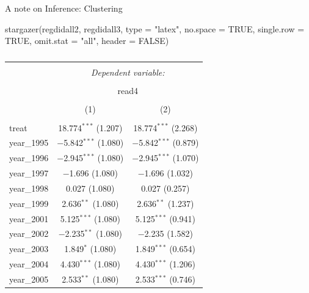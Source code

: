 \documentclass[
  ignorenonframetext,
]{beamer}
\newenvironment{Shaded}{\begin{snugshade}}{\end{snugshade}}
\newcommand{\AttributeTok}[1]{\textcolor[rgb]{0.77,0.63,0.00}{#1}}
\newcommand{\ConstantTok}[1]{\textcolor[rgb]{0.00,0.00,0.00}{#1}}
\newcommand{\FunctionTok}[1]{\textcolor[rgb]{0.00,0.00,0.00}{#1}}
\newcommand{\NormalTok}[1]{#1}
\newcommand{\StringTok}[1]{\textcolor[rgb]{0.31,0.60,0.02}{#1}}
\begin{document}
\begin{frame}[fragile]{A note on Inference: Clustering}
\protect\hypertarget{a-note-on-inference-clustering-2}{}
\tiny

\begin{Shaded}
\begin{Highlighting}[]
\FunctionTok{stargazer}\NormalTok{(regdidall2, regdidall3, }\AttributeTok{type =} \StringTok{"latex"}\NormalTok{, }\AttributeTok{no.space =} \ConstantTok{TRUE}\NormalTok{,}
    \AttributeTok{single.row =} \ConstantTok{TRUE}\NormalTok{, }\AttributeTok{omit.stat =} \StringTok{"all"}\NormalTok{, }\AttributeTok{header =} \ConstantTok{FALSE}\NormalTok{)}
\end{Highlighting}
\end{Shaded}

\begin{table}[!htbp] \centering 
  \caption{} 
  \label{} 
\begin{tabular}{@{\extracolsep{5pt}}lcc} 
\\[-1.8ex]\hline 
\hline \\[-1.8ex] 
 & \multicolumn{2}{c}{\textit{Dependent variable:}} \\ 
\cline{2-3} 
\\[-1.8ex] & \multicolumn{2}{c}{read4} \\ 
\\[-1.8ex] & (1) & (2)\\ 
\hline \\[-1.8ex] 
 treat & 18.774$^{***}$ (1.207) & 18.774$^{***}$ (2.268) \\ 
  year\_1995 & $-$5.842$^{***}$ (1.080) & $-$5.842$^{***}$ (0.879) \\ 
  year\_1996 & $-$2.945$^{***}$ (1.080) & $-$2.945$^{***}$ (1.070) \\ 
  year\_1997 & $-$1.696 (1.080) & $-$1.696 (1.032) \\ 
  year\_1998 & 0.027 (1.080) & 0.027 (0.257) \\ 
  year\_1999 & 2.636$^{**}$ (1.080) & 2.636$^{**}$ (1.237) \\ 
  year\_2001 & 5.125$^{***}$ (1.080) & 5.125$^{***}$ (0.941) \\ 
  year\_2002 & $-$2.235$^{**}$ (1.080) & $-$2.235 (1.582) \\ 
  year\_2003 & 1.849$^{*}$ (1.080) & 1.849$^{***}$ (0.654) \\ 
  year\_2004 & 4.430$^{***}$ (1.080) & 4.430$^{***}$ (1.206) \\ 
  year\_2005 & 2.533$^{**}$ (1.080) & 2.533$^{***}$ (0.746) \\ 

\end{tabular}
\end{table}
\end{frame}
\end{document}
